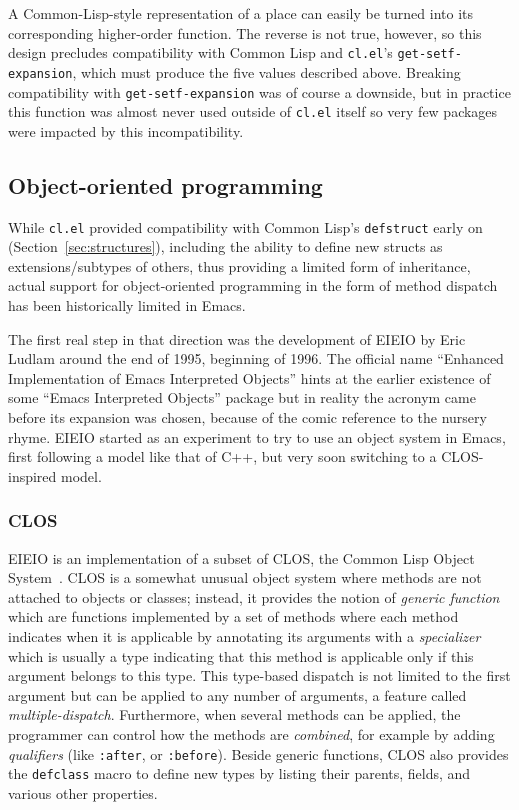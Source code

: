 \documentclass[format=acmsmall, review]{acmart}
\begin{document}
A Common-Lisp-style representation of a place can easily be turned into
its corresponding higher-order function.  The reverse is not true, however, so
this design precludes compatibility with Common Lisp and
\texttt{cl.el}'s \texttt{get-setf-expansion}, which must produce the
five values described above.
Breaking compatibility with \texttt{get-setf-expansion}
was of course
a downside, but in practice this function was almost never used outside of
\texttt{cl.el} itself so very few packages were impacted by
this incompatibility.

\subsection{Object-oriented programming} %
\label{sec:oop}

While \texttt{cl.el} provided compatibility with Common
Lisp's \texttt{defstruct} early on (Section~\ref{sec:structures}), including the
ability to define new structs as extensions/subtypes of others, thus
providing a limited form of inheritance, actual support for object-oriented
programming in the form of method dispatch has been historically limited
in Emacs.

The first real step in that direction was the development of EIEIO by Eric
Ludlam around the end of 1995, beginning of 1996.  The official name ``Enhanced
Implementation of Emacs Interpreted Objects'' hints at the earlier existence
of some ``Emacs Interpreted Objects'' package but in reality the acronym
came before its expansion was chosen, because of the comic reference to the
nursery rhyme.
EIEIO started as an experiment to try to use
an object system in Emacs, first following a model like that of C++, but
very soon switching to a CLOS-inspired model.

\subsubsection{CLOS}

EIEIO is an implementation of a subset of CLOS, the Common Lisp Object
System~\cite{DeMichielGabriel1987}.  CLOS is a somewhat unusual object
system where methods are not attached to objects or classes; instead, it
provides the notion of \emph{generic function} which are functions
implemented by a set of methods where each method indicates when it is
applicable by annotating its arguments with a \emph{specializer} which is
usually a type indicating that this method is applicable only if this
argument belongs to this type.  This type-based dispatch is not limited to
the first argument but can be applied to any number of arguments, a feature
called \emph{multiple-dispatch}.  Furthermore, when several methods can be
applied, the programmer can control how the methods are \emph{combined}, for
example by adding \emph{qualifiers} (like \texttt{:after}, or
\texttt{:before}).  Beside generic functions, CLOS also provides the
\texttt{defclass} macro to define new types by listing their parents,
fields, and various other properties.
\end{document}
